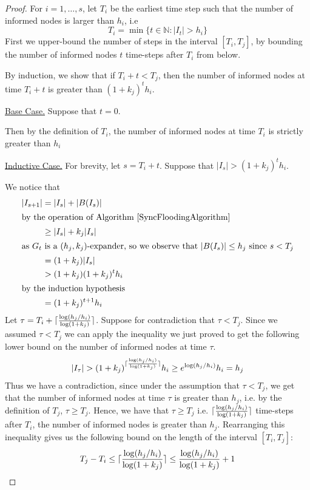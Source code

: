 \begin{proof}
	For $i = 1,\dots, s$, let $T_i$ be the earliest time step such that the number of informed nodes is larger than $h_i$, i.e
	$$
		T_i = \min \{ t \in \mathbb{N} : |I_t| > h_i \}
	$$
	First we upper-bound the number of steps in the interval $[T_i, T_j]$,
	by bounding the number of informed nodes $t$ time-steps after $T_i$ from below.

	By induction, we show that if $T_i + t < T_j$, then the number of informed nodes at time $T_i + t$ is greater than $(1+k_j)^t h_i$.
	
	\underline{Base Case.} Suppose that $t=0$. 
	
	Then by the definition of $T_i$, the number of informed nodes at time $T_i$ is strictly greater than $h_i$

	\underline{Inductive Case.} For brevity, let $s = T_i + t$. Suppose that $|I_s| > (1+k_j)^t h_i$.

	We notice that 
	\begin{align*}\label{}
		|I_{s+1}| &= |I_s| + |B(I_s)| \\
		\intertext{by the operation of Algorithm \ref{SyncFloodingAlgorithm}}
		& \geq |I_s| + k_j |I_s| \\ 
		\intertext{as $G_t$ is a $(h_j, k_j)$-expander, so we observe that $|B(I_s)| \leq h_j$ since $s < T_j$}
		& = (1 + k_j)|I_s| \\
		& > (1 + k_j)(1+k_j)^t h_i \\
		\intertext{by the induction hypothesis}
		& = (1+k_j)^{t+1} h_i
	\end{align*}
	Let $\tau = T_i + \lceil \frac{\log (h_j/h_i)}{\log(1+k_j)}\rceil$. 
	Suppose for contradiction that $\tau < T_j$.
	Since we assumed $\tau < T_j$ we can apply the inequality we just proved
	to get the following lower bound on the number of informed nodes at time $\tau$.
	$$
		|I_\tau| > 
		(1+k_j)^{\lceil \frac{\log (h_j/h_i)}{\log(1+k_j)}\rceil} h_i
		\geq e^{\log (h_j/h_i)} h_i
		= h_j
	$$
	Thus we have a contradiction, since under the assumption that $\tau < T_j$, we get that the number of informed nodes at time $\tau$ is greater than $h_j$, i.e. by the definition of $T_j$, $\tau \geq T_j$. Hence, we have that $\tau \geq T_j$ i.e. $\lceil \frac{\log (h_j/h_i)}{\log(1+k_j)}\rceil$ time-steps after $T_i$, the number of informed nodes is greater than $h_j$. Rearranging this inequality gives us the following bound on the length of the interval $[T_i, T_j]$:
	\begin{equation} \label{eq:FloodingIntervalBound}
		T_j - T_i \leq \lceil \frac{\log (h_j/h_i)}{\log(1+k_j)}\rceil \leq \frac{\log (h_j/h_i)}{\log(1+k_j)} + 1
	\end{equation}


\end{proof}
